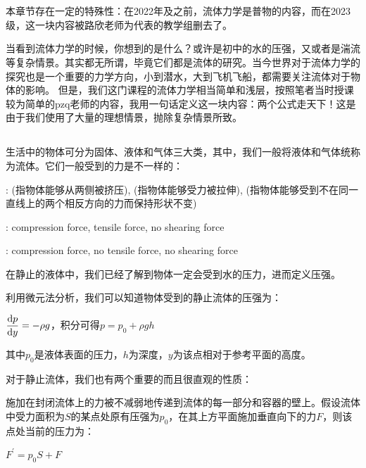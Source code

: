 \chapter[流体力学]{}
本章节存在一定的特殊性：在2022年及之前，流体力学是普物的内容，而在2023级，这一块内容被路欣老师为代表的教学组删去了。

当看到流体力学的时候，你想到的是什么？或许是初中的水的压强，又或者是湍流等复杂情景。其实都无所谓，毕竟它们都是流体的研究。当今世界对于流体力学的探究也是一个重要的力学方向，小到潜水，大到飞机飞船，都需要关注流体对于物体的影响。
但是，我们这门课程的流体力学相当简单和浅层，按照笔者当时授课较为简单的pzq老师的内容，我用一句话定义这一块内容：两个公式走天下！这是由于我们使用了大量的理想情景，抛除复杂情景所致。
\section[流体的定义与性质]{}
生活中的物体可分为固体、液体和气体三大类，其中，我们一般将液体和气体统称为流体。它们一般受到的力是不一样的：
\begin{Itemize}
    \item {}: (指物体能够从两侧被挤压), (指物体能够受力被拉伸),
    (指物体能够受到不在同一直线上的两个相反方向的力而保持形状不变)
    \item {}: compression force, tensile force, no shearing force
    \item {}: compression force, no tensile force, no shearing force
\end{Itemize}

在静止的液体中，我们已经了解到物体一定会受到水的压力，进而定义压强。
\begin{law}[静止流体中的压强]
    利用微元法分析，我们可以知道物体受到的静止流体的压强为：
    \begin{center}
        $\dfrac{\dif p}{\dif y}=-\rho g$，积分可得$p=p_0+\rho gh$
    \end{center}

    其中$p_0$是液体表面的压力，$h$为深度，$y$为该点相对于参考平面的高度。
\end{law}

对于静止流体，我们也有两个重要的而且很直观的性质：
\begin{law}
    施加在封闭流体上的力被不减弱地传递到流体的每一部分和容器的壁上。假设流体中受力面积为$S$的某点处原有压强为$p_0$，在其上方平面施加垂直向下的力$F$，则该点处当前的压力为：
    \begin{center}
        $F^{'}=p_0 S +F$
    \end{center}
\end{law}

